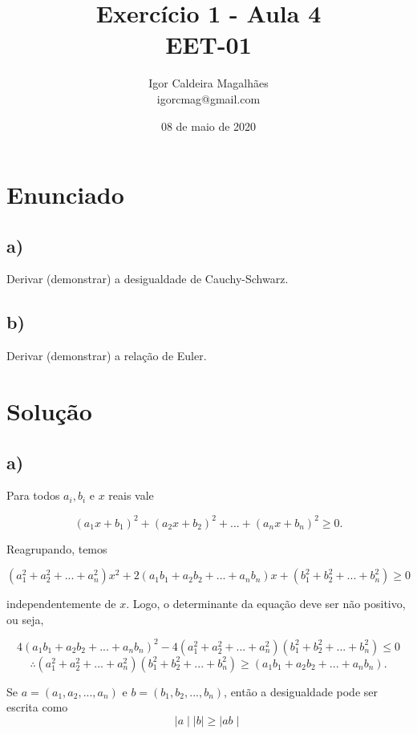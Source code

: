 \documentclass[a4paper, 12pt]{article}
\title{Exercício 1 - Aula 4 \\ EET-01}
\author{
  Igor Caldeira Magalhães\\igorcmag@gmail.com
}
\date{08 de maio de 2020}
\begin{document}
\maketitle
\section{Enunciado}

\subsection{a)}
Derivar (demonstrar) a desigualdade de Cauchy-Schwarz.

\subsection{b)} 
Derivar (demonstrar) a relação de Euler.


\section{Solução}

\subsection{a)}

Para todos $a_i, b_i$ e $x$ reais vale

$$(a_1x+b_1)^2 + (a_2x+b_2)^2 + ... + (a_nx+b_n)^2 \geqslant 0. $$

Reagrupando, temos

$$(a_1^2+a_2^2+ ... +a_n^2)x^2 + 2(a_1b_1 + a_2b_2 + ... + a_nb_n)x + (b_1^2 + b_2^2 + ... + b_n^2) \geqslant 0$$

independentemente de $x$. Logo, o determinante da equação deve ser não positivo, ou seja, 

$$4(a_1b_1 + a_2b_2 + ... + a_nb_n)^2-4(a_1^2+a_2^2+ ... +a_n^2)(b_1^2 + b_2^2 + ... + b_n^2)\leqslant 0$$
$$\therefore (a_1^2+a_2^2+ ... +a_n^2)(b_1^2 + b_2^2 + ... + b_n^2) \geqslant (a_1b_1 + a_2b_2 + ... + a_nb_n).$$

Se $a = (a_1,a_2,...,a_n)$ e $b = (b_1,b_2,...,b_n)$, então a desigualdade pode ser escrita como
$$\mid a\mid\mid b\mid \geqslant \mid ab\mid$$
\end{document}
